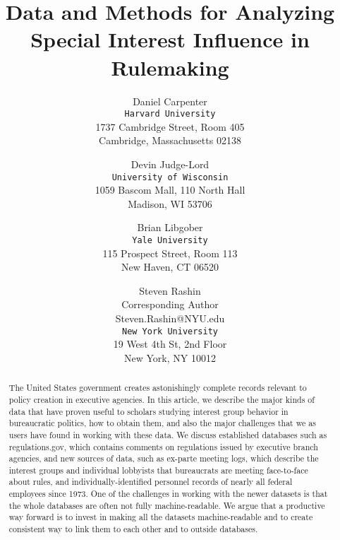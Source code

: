 \documentclass[12pt,notitlepage]{article}
\newcounter{cor}
\begin{document}
	
	\title{Data and Methods for Analyzing Special Interest Influence in Rulemaking}
	\author{
		Daniel Carpenter \\
		\texttt{Harvard University} \\
		1737 Cambridge Street, 	 Room 405\\
		Cambridge, Massachusetts 02138 \\
		\and 
		Devin Judge-Lord\\
		\texttt{University of Wisconsin} \\
		1059 Bascom Mall, 110 North Hall \\
		Madison, WI 53706 \\
		\and 
		Brian Libgober \\
		\texttt{Yale University}\\
		115 Prospect Street, Room 113 \\
		New Haven, CT 06520 \\
		\and 
		Steven Rashin\\
		Corresponding Author \\
		Steven.Rashin@NYU.edu \\
		\texttt{New York University} \\
		19 West 4th St, 2nd Floor \\
		New York, NY 10012 \\
	}
	\date{}
	
	\maketitle
	
	\singlespacing
	\begin{abstract}
		The United States government creates astonishingly complete records relevant to policy creation in executive agencies.  In this article, we describe the major kinds of data that have proven useful to scholars studying interest group behavior in bureaucratic politics, how to obtain them, and also the major challenges that we as users have found in working with these data.  We discuss established databases such as regulations.gov, which contains comments on regulations issued by executive branch agencies, and new sources of data, such as ex-parte meeting logs, which describe the interest groups and individual lobbyists that bureaucrats are meeting face-to-face about rules, and individually-identified personnel records of nearly all federal employees since 1973.  One of the challenges in working with the newer datasets is that the whole databases are often not fully machine-readable.  We argue that a productive way forward is to invest in making all the datasets machine-readable and to create consistent way to link them to each other and to outside databases.   
		
	\end{abstract} \hspace{10pt}
	
\end{document}
